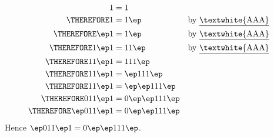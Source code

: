 \begin{align*}
 1 &= 1 \cr
\THEREFORE         1 &= 1\ep                  & & \text{by \underline{\textwhite{AAA}}} \cr
\THEREFORE     \ep 1 &= 1\ep                  & & \text{by \underline{\textwhite{AAA}}} \cr
\THEREFORE   1 \ep 1 &= 11 \ep                & & \text{by \underline{\textwhite{AAA}}} \cr
\THEREFORE  11 \ep 1 &= 111 \ep                 \cr
\THEREFORE  11 \ep 1 &= \ep 111 \ep             \cr
\THEREFORE  11 \ep 1 &= \ep\ep 111 \ep          \cr
\THEREFORE 011 \ep 1 &= 0 \ep\ep 111 \ep        \cr
\THEREFORE \ep 011 \ep 1 &= 0 \ep\ep 111 \ep    \cr
\end{align*}
Hence $\ep 011 \ep 1 = 0 \ep\ep 111 \ep$.
